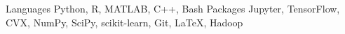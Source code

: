 \begin{cvskills}
  \cvskill
    {Languages} %
    {Python, R, MATLAB, C++, Bash} %
  \cvskill
    {Packages} %
    {Jupyter, TensorFlow, CVX, NumPy, SciPy, scikit-learn, Git, \LaTeX, Hadoop} %
        
\end{cvskills}
